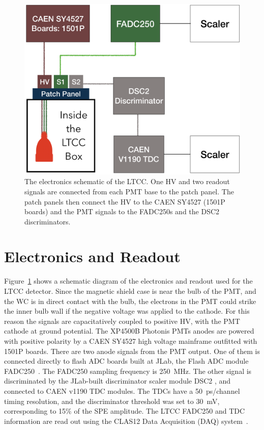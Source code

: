 \begin{figure}
	\centering
	\includegraphics[width=0.99\columnwidth, height=0.6\columnwidth]{img/electronicScheme.png}
	\caption{The electronics schematic of the LTCC. One HV and two readout signals are connected from each PMT
          base to the patch panel. The patch panels then connect the HV to the CAEN SY4527 (1501P boards) and the
          PMT signals to the FADC250s and the DSC2 discriminators.}
	\label{fig:electronicScheme}
\end{figure}

\section{Electronics and Readout}

Figure~\ref{fig:electronicScheme} shows a schematic diagram of the electronics and readout used for the LTCC
detector. Since the magnetic shield case is near the bulb of the PMT, and the WC is in direct contact with the bulb,
the electrons in the PMT could strike the inner bulb wall if the negative voltage was applied to the cathode. For this
reason the signals are capacitatively coupled to positive HV, with the PMT cathode at ground potential. The
XP4500B Photonis PMTs anodes are powered with positive polarity by a CAEN SY4527 high voltage mainframe
outfitted with 1501P boards. There are two anode signals from the PMT output. One of them is connected directly to
flash ADC boards built at JLab, the Flash ADC module FADC250~\cite{daq-nim}. The FADC250 sampling
frequency is 250~MHz. The other signal is discriminated by the JLab-built discriminator scaler module DSC2
\cite{daq-nim}, and connected to CAEN v1190 TDC modules. The TDCs have a 50~ps/channel timing resolution, and
the discriminator threshold was set to 30~mV, corresponding to 15\% of the SPE amplitude. The LTCC FADC250 and
TDC information are read out using the CLAS12 Data Acquisition (DAQ) system~\cite{daq-nim}.

